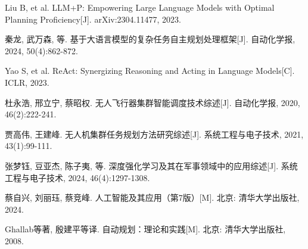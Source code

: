\documentclass[12pt,a4paper]{ctexart}
\begin{document}
\begin{enumerate}[leftmargin=2em, label={[\arabic*]}]
    \item Liu B, et al. LLM+P: Empowering Large Language Models with Optimal Planning Proficiency[J]. arXiv:2304.11477, 2023.
    \item 秦龙, 武万森, 等. 基于大语言模型的复杂任务自主规划处理框架[J]. 自动化学报, 2024, 50(4):862-872.
    \item Yao S, et al. ReAct: Synergizing Reasoning and Acting in Language Models[C]. ICLR, 2023.

    \item 杜永浩, 邢立宁, 蔡昭权. 无人飞行器集群智能调度技术综述[J]. 自动化学报, 2020, 46(2):222-241.
    \item 贾高伟, 王建峰. 无人机集群任务规划方法研究综述[J]. 系统工程与电子技术, 2021, 43(1):99-111.

    \item 张梦钰, 豆亚杰, 陈子夷, 等. 深度强化学习及其在军事领域中的应用综述[J]. 系统工程与电子技术, 2024, 46(4):1297-1308.

    \item 蔡自兴, 刘丽珏, 蔡竞峰. 人工智能及其应用（第7版）[M]. 北京: 清华大学出版社, 2024.
    \item Ghallab等著, 殷建平等译. 自动规划：理论和实践[M]. 北京: 清华大学出版社, 2008.
\end{enumerate}
\end{document}

